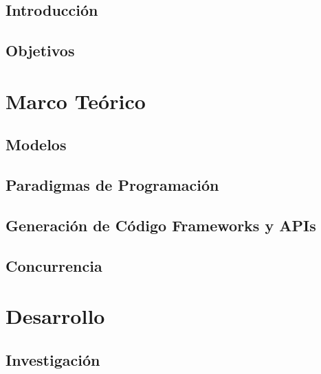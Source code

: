 \documentclass[twoside, openright]{report}
\begin{document}
        \chapter{Introducción}
        
        \chapter{Objetivos}
        
    \part{Marco Teórico}
        \label{cap:marco_teorico}
        
        \chapter{Modelos}
            \label{cap:modelos}
            
        \chapter{Paradigmas de Programación}
            \label{cap:paradigmas_programacion}
            
            
            
        \chapter{Generación de Código Frameworks y APIs}
            \label{generacion_frameworks_apis}
            
            
        \chapter{Concurrencia}
            \label{cap:concurrencia}
            

    \part{Desarrollo}
        \chapter{Investigación}
            \label{cap:investigacion}
            
\end{document}
